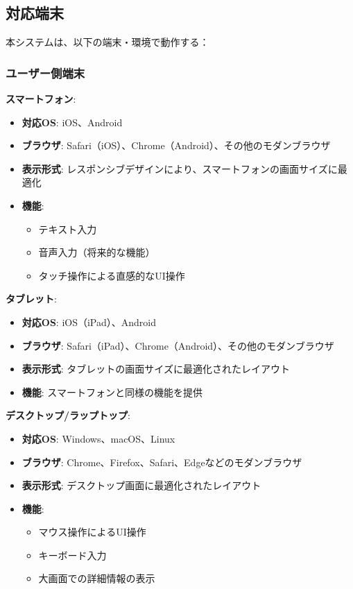 \documentclass[a4paper,11pt,ja=standard,xelatex]{bxjsarticle}
\theoremstyle{definition}
\begin{document}
\subsection{対応端末}

本システムは、以下の端末・環境で動作する：

\subsubsection{ユーザー側端末}

\textbf{スマートフォン}:
\begin{itemize}
\item \textbf{対応OS}: iOS、Android
\item \textbf{ブラウザ}: Safari（iOS）、Chrome（Android）、その他のモダンブラウザ
\item \textbf{表示形式}: レスポンシブデザインにより、スマートフォンの画面サイズに最適化
\item \textbf{機能}: 
  \begin{itemize}
  \item テキスト入力
  \item 音声入力（将来的な機能）
  \item タッチ操作による直感的なUI操作
  \end{itemize}
\end{itemize}

\textbf{タブレット}:
\begin{itemize}
\item \textbf{対応OS}: iOS（iPad）、Android
\item \textbf{ブラウザ}: Safari（iPad）、Chrome（Android）、その他のモダンブラウザ
\item \textbf{表示形式}: タブレットの画面サイズに最適化されたレイアウト
\item \textbf{機能}: スマートフォンと同様の機能を提供
\end{itemize}

\textbf{デスクトップ/ラップトップ}:
\begin{itemize}
\item \textbf{対応OS}: Windows、macOS、Linux
\item \textbf{ブラウザ}: Chrome、Firefox、Safari、Edgeなどのモダンブラウザ
\item \textbf{表示形式}: デスクトップ画面に最適化されたレイアウト
\item \textbf{機能}: 
  \begin{itemize}
  \item マウス操作によるUI操作
  \item キーボード入力
  \item 大画面での詳細情報の表示
  \end{itemize}
\end{itemize}
\end{document}

